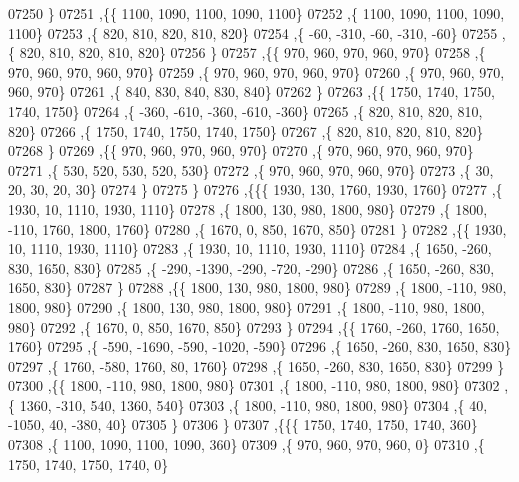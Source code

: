\begin{DoxyCode}
07250     \}
07251    ,\{\{  1100,  1090,  1100,  1090,  1100\}
07252     ,\{  1100,  1090,  1100,  1090,  1100\}
07253     ,\{   820,   810,   820,   810,   820\}
07254     ,\{   -60,  -310,   -60,  -310,   -60\}
07255     ,\{   820,   810,   820,   810,   820\}
07256     \}
07257    ,\{\{   970,   960,   970,   960,   970\}
07258     ,\{   970,   960,   970,   960,   970\}
07259     ,\{   970,   960,   970,   960,   970\}
07260     ,\{   970,   960,   970,   960,   970\}
07261     ,\{   840,   830,   840,   830,   840\}
07262     \}
07263    ,\{\{  1750,  1740,  1750,  1740,  1750\}
07264     ,\{  -360,  -610,  -360,  -610,  -360\}
07265     ,\{   820,   810,   820,   810,   820\}
07266     ,\{  1750,  1740,  1750,  1740,  1750\}
07267     ,\{   820,   810,   820,   810,   820\}
07268     \}
07269    ,\{\{   970,   960,   970,   960,   970\}
07270     ,\{   970,   960,   970,   960,   970\}
07271     ,\{   530,   520,   530,   520,   530\}
07272     ,\{   970,   960,   970,   960,   970\}
07273     ,\{    30,    20,    30,    20,    30\}
07274     \}
07275    \}
07276   ,\{\{\{  1930,   130,  1760,  1930,  1760\}
07277     ,\{  1930,    10,  1110,  1930,  1110\}
07278     ,\{  1800,   130,   980,  1800,   980\}
07279     ,\{  1800,  -110,  1760,  1800,  1760\}
07280     ,\{  1670,     0,   850,  1670,   850\}
07281     \}
07282    ,\{\{  1930,    10,  1110,  1930,  1110\}
07283     ,\{  1930,    10,  1110,  1930,  1110\}
07284     ,\{  1650,  -260,   830,  1650,   830\}
07285     ,\{  -290, -1390,  -290,  -720,  -290\}
07286     ,\{  1650,  -260,   830,  1650,   830\}
07287     \}
07288    ,\{\{  1800,   130,   980,  1800,   980\}
07289     ,\{  1800,  -110,   980,  1800,   980\}
07290     ,\{  1800,   130,   980,  1800,   980\}
07291     ,\{  1800,  -110,   980,  1800,   980\}
07292     ,\{  1670,     0,   850,  1670,   850\}
07293     \}
07294    ,\{\{  1760,  -260,  1760,  1650,  1760\}
07295     ,\{  -590, -1690,  -590, -1020,  -590\}
07296     ,\{  1650,  -260,   830,  1650,   830\}
07297     ,\{  1760,  -580,  1760,    80,  1760\}
07298     ,\{  1650,  -260,   830,  1650,   830\}
07299     \}
07300    ,\{\{  1800,  -110,   980,  1800,   980\}
07301     ,\{  1800,  -110,   980,  1800,   980\}
07302     ,\{  1360,  -310,   540,  1360,   540\}
07303     ,\{  1800,  -110,   980,  1800,   980\}
07304     ,\{    40, -1050,    40,  -380,    40\}
07305     \}
07306    \}
07307   ,\{\{\{  1750,  1740,  1750,  1740,   360\}
07308     ,\{  1100,  1090,  1100,  1090,   360\}
07309     ,\{   970,   960,   970,   960,     0\}
07310     ,\{  1750,  1740,  1750,  1740,     0\}

\end{DoxyCode}
